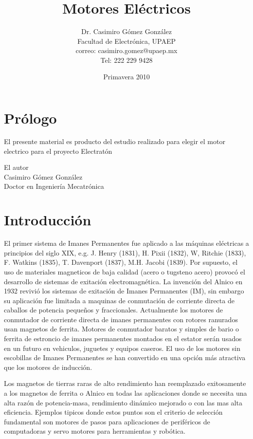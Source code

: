 \documentclass[12pt]{book}
\title{Motores Eléctricos}
\author{Dr. Casimiro Gómez González\\
	Facultad de Electrónica, UPAEP\\
               correo: casimiro.gomez@upaep.mx\\
               Tel: 222 229 9428}
\date{Primavera 2010}
\theoremstyle{definition}
\theoremstyle{remark}
\theoremstyle{plain}
\begin{document}
\frontmatter
\maketitle


\chapter{Prólogo}

El presente material es producto del estudio realizado para elegir el motor electrico para el proyecto Electratón

\begin{flushright}

El autor\\
Casimiro Gómez González\\
Doctor en Ingeniería Mecatrónica
\end{flushright}

\tableofcontents

\mainmatter
\chapter{Introducción}
El primer sistema de Imanes Permanentes fue aplicado a las máquinas eléctricas a principios del siglo XIX, e.g. J. Henry (1831), H. Pixii (1832), W, Ritchie (1833), F. Watkins (1835), T. Davenport (1837), M.H. Jacobi (1839). Por supuesto, el uso de materiales magneticos de baja calidad (acero o tugsteno acero) provocó el desarrollo de sistemas de exitación electromagnética. La invención del Alnico en 1932 revivió los sistemas  de exitación de Imanes Permanentes (IM), sin embargo su aplicación fue limitada a maquinas de conmutación de corriente directa de caballos de potencia pequeños y fraccionales. Actualmente los motores de conmutador de corriente directa de imanes permanentes  con rotores ranurados usan magnetos de ferrita. Motores de conmutador baratos y simples de bario o ferrita de estroncio de imanes permanentes montados en el estator serán usados en un futuro en vehiculos, juguetes y equipos caseros. El uso de los motores sin escobillas de Imanes Permanentes se han convertido en una opción más atractiva que los motores de inducción.

Los magnetos de tierras raras de alto rendimiento han reemplazado exitosamente a los magnetos de ferrita o Alnico en todas las aplicaciones donde se necesita una alta razón de potencia-masa, rendimiento dinámico mejorado o con las mas alta eficiencia. Ejemplos tipicos donde estos puntos son el criterio de selección fundamental son motores de pasos para aplicaciones de  periféricos de  computadoras y servo motores para herramientas y robótica.
\end{document}
